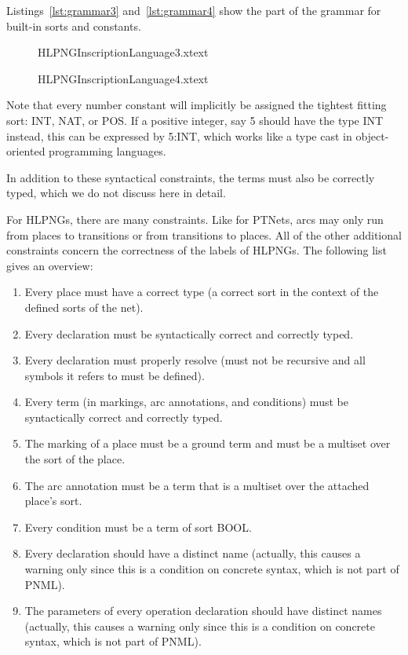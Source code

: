 Listings~\ref{lst:grammar3} and~\ref{lst:grammar4} show the part of the
grammar for built-in sorts and constants.
\begin{figure}[htbp!]
%
  {HLPNGInscriptionLanguage3.xtext}
\end{figure} 
%
\begin{figure}[htbp!]
%
  {HLPNGInscriptionLanguage4.xtext}
\end{figure} 
Note that every number constant will implicitly be assigned the tightest fitting
sort: INT, NAT, or POS. If a positive integer, say 5 should have the type
INT instead, this can be expressed by 5:INT, which works like a type cast in
object-oriented programming languages.

In addition to these syntactical constraints, the terms must also be correctly
typed, which we do not discuss here in detail. 

For HLPNGs, there are many constraints. Like for PTNets, arcs may only
run from places to transitions or from transitions to places. All of the
other additional constraints concern the correctness of the labels of
HLPNGs. The following list gives an overview:
\begin{enumerate}
  \item Every place must have a correct type (a correct sort in the context of
        the defined sorts of the net).
  \item Every declaration must be syntactically correct and correctly typed.
  \item Every declaration must properly resolve (must not be recursive and all
        symbols it refers to must be defined).
  \item Every term (in markings, arc annotations, and conditions) must
        be syntactically correct and correctly typed.
  \item The marking of a place must be a ground term and must be
        a multiset over the sort of the place.
  \item The arc annotation must be a term that is a multiset over the
        attached place's sort.
  \item Every condition must be a term of sort BOOL.
  \item Every declaration should have a distinct name (actually, this causes a
        warning only since this is a condition on concrete syntax, which is not
        part of PNML).
  \item The parameters of every operation declaration should have distinct names
        (actually, this causes a warning only since this is a condition
        on concrete syntax, which is not part of PNML). 
\end{enumerate}


